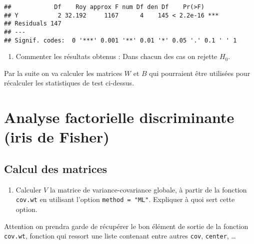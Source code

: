 \documentclass[
]{article}
\newenvironment{Shaded}{\begin{snugshade}}{\end{snugshade}}
\newcommand{\DataTypeTok}[1]{\textcolor[rgb]{0.13,0.29,0.53}{#1}}
\newcommand{\DecValTok}[1]{\textcolor[rgb]{0.00,0.00,0.81}{#1}}
\newcommand{\KeywordTok}[1]{\textcolor[rgb]{0.13,0.29,0.53}{\textbf{#1}}}
\newcommand{\NormalTok}[1]{#1}
\newcommand{\OperatorTok}[1]{\textcolor[rgb]{0.81,0.36,0.00}{\textbf{#1}}}
\newcommand{\StringTok}[1]{\textcolor[rgb]{0.31,0.60,0.02}{#1}}
\providecommand{\tightlist}{%
  \setlength{\itemsep}{0pt}\setlength{\parskip}{0pt}}
\begin{document}
\begin{verbatim}
##            Df    Roy approx F num Df den Df    Pr(>F)    
## Y           2 32.192     1167      4    145 < 2.2e-16 ***
## Residuals 147                                            
## ---
## Signif. codes:  0 '***' 0.001 '**' 0.01 '*' 0.05 '.' 0.1 ' ' 1
\end{verbatim}

\begin{enumerate}
\def\labelenumi{\arabic{enumi}.}
\setcounter{enumi}{13}
\tightlist
\item
  Commenter les résultats obtenus : Dans chacun des cas on rejette
  \(H_0\).
\end{enumerate}

Par la suite on va calculer les matrices \(W\) et \(B\) qui pourraient
être utilisées pour récalculer les statistiques de test ci-dessus.

\hypertarget{analyse-factorielle-discriminante-iris-de-fisher}{%
\section{Analyse factorielle discriminante (iris de
Fisher)}\label{analyse-factorielle-discriminante-iris-de-fisher}}

\hypertarget{calcul-des-matrices}{%
\subsection{Calcul des matrices}\label{calcul-des-matrices}}

\begin{enumerate}
\def\labelenumi{\arabic{enumi}.}
\setcounter{enumi}{14}
\tightlist
\item
  Calculer \(V\) la matrice de variance-covariance globale, à partir de
  la fonction \texttt{cov.wt} en utilisant l'option
  \texttt{method = "ML"}. Expliquer à quoi sert cette option.
\end{enumerate}

\begin{Shaded}
\end{Shaded}

Attention on prendra garde de récupérer le bon élément de sortie de la
fonction \texttt{cov.wt}, fonction qui ressort une liste contenant entre
autres \texttt{cov}, \texttt{center}, \ldots{}
\end{document}
